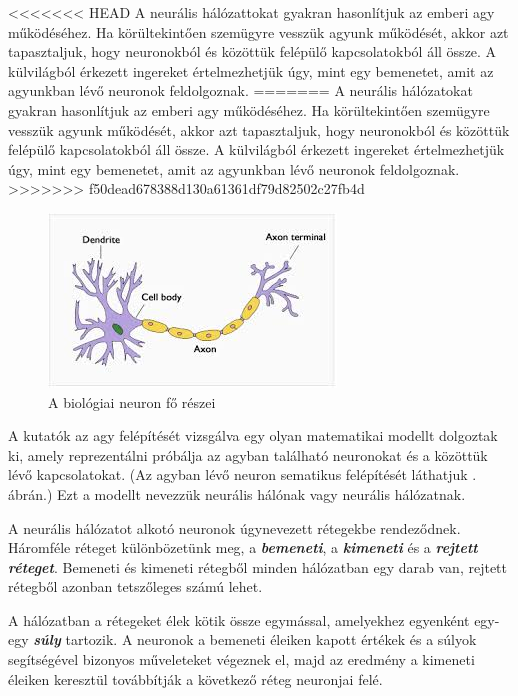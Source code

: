 
<<<<<<< HEAD
A neurális hálózattokat\cite{neurális77} gyakran hasonlítjuk az emberi agy működéséhez. Ha körültekintően szemügyre vesszük agyunk működését, akkor azt tapasztaljuk, hogy neuronokból és közöttük felépülő kapcsolatokból áll össze. A külvilágból érkezett ingereket értelmezhetjük úgy, mint egy bemenetet, amit az agyunkban lévő neuronok feldolgoznak.
=======
A neurális hálózatokat gyakran hasonlítjuk az emberi agy működéséhez. Ha körültekintően szemügyre vesszük agyunk működését, akkor azt tapasztaljuk, hogy neuronokból és közöttük felépülő kapcsolatokból áll össze. A külvilágból érkezett ingereket értelmezhetjük úgy, mint egy bemenetet, amit az agyunkban lévő neuronok feldolgoznak.
>>>>>>> f50dead678388d130a61361df79d82502c27fb4d

\begin{figure}
	\centering
	\includegraphics[scale=1.0]{images/neuron.png}
	\caption{A biológiai neuron fő részei}
	\label{fig:neuron}
\end{figure}

A kutatók az agy felépítését vizsgálva egy olyan matematikai modellt dolgoztak ki, amely   reprezentálni próbálja az agyban található neuronokat  és a közöttük lévő kapcsolatokat. (Az agyban lévő neuron sematikus felépítését láthatjuk . ábrán.) Ezt a modellt nevezzük neurális hálónak vagy neurális hálózatnak.

A neurális hálózatot alkotó neuronok úgynevezett rétegekbe rendeződnek. Háromféle réteget különbözetünk meg, a \textbf{\textit{bemeneti}}, a \textbf{\textit{kimeneti}} és a \textbf{\textit{rejtett réteget}}. Bemeneti és kimeneti rétegből minden hálózatban egy darab van, rejtett rétegből azonban tetszőleges számú lehet.

A hálózatban a rétegeket élek kötik össze egymással, amelyekhez egyenként egy-egy \textbf{\textit{súly}} tartozik. A neuronok a bemeneti éleiken kapott értékek és a súlyok segítségével bizonyos műveleteket végeznek el, majd az eredmény a kimeneti éleiken keresztül továbbítják a következő réteg neuronjai felé.

